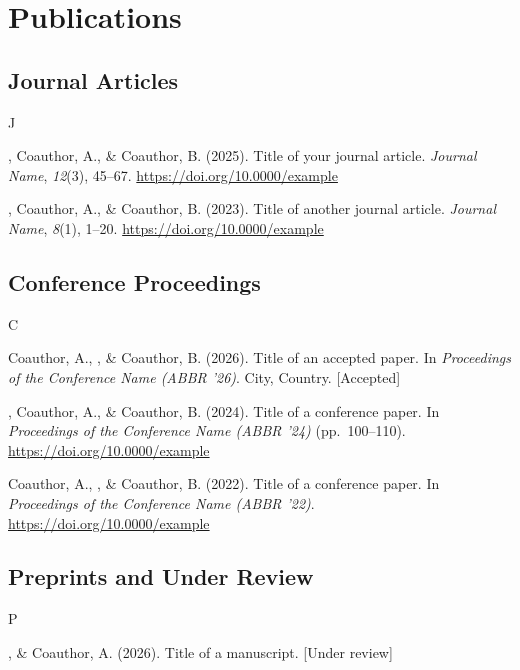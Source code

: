 \documentclass[11pt,letterpaper]{article}   %
\begin{document}
\section*{Publications}
\subsection{Journal Articles}
\begin{publist}{J}
  \item {}, Coauthor, A., \& Coauthor, B. (2025).
  Title of your journal article. \textit{Journal Name}, \textit{12}(3), 45--67.
  \url{https://doi.org/10.0000/example}

  \item {}, Coauthor, A., \& Coauthor, B. (2023).
  Title of another journal article. \textit{Journal Name}, \textit{8}(1), 1--20.
  \url{https://doi.org/10.0000/example}
\end{publist}

\subsection{Conference Proceedings}
\begin{publist}{C}
  \item Coauthor, A., , \& Coauthor, B. (2026).
  Title of an accepted paper. In \textit{Proceedings of the Conference Name (ABBR '26)}.
  City, Country. [Accepted]

  \item {}, Coauthor, A., \& Coauthor, B. (2024).
  Title of a conference paper. In \textit{Proceedings of the Conference Name (ABBR '24)}
  (pp.\ 100--110). \url{https://doi.org/10.0000/example}

  \item Coauthor, A., , \& Coauthor, B. (2022).
  Title of a conference paper. In \textit{Proceedings of the Conference Name (ABBR '22)}.
  \url{https://doi.org/10.0000/example}
\end{publist}

\subsection{Preprints and Under Review}
\begin{publist}{P}
  \item {}, \& Coauthor, A. (2026). Title of a manuscript. [Under review]
\end{publist}
\end{document}
